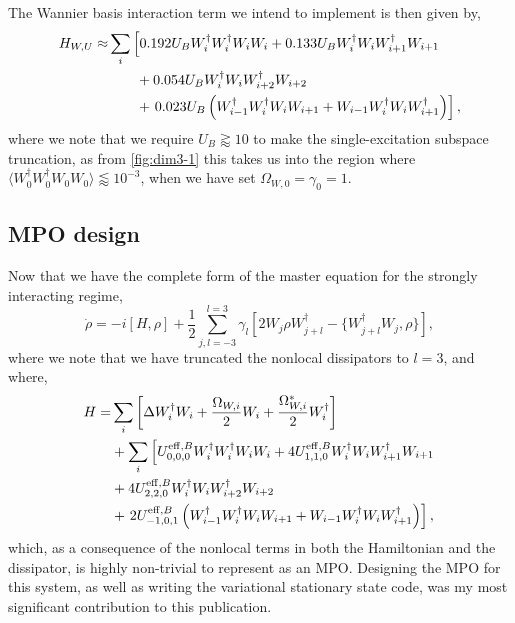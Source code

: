 The Wannier basis interaction term we intend to implement is then given by,
\begin{align}
	H_{W,U} \approx &\sum_{i} \left[ 0.192U_{B}W_{i}^{\dagger}W_{i}^{\dagger}W_{i}W_{i} + 0.133U_{B}W_{i}^{\dagger}W_{i}W_{i+1}^{\dagger}W_{i+1} \right. \notag \\
	&\qquad+ 0.054U_{B}W_{i}^{\dagger}W_{i}W_{i+2}^{\dagger}W_{i+2} \notag \\
	&\qquad+ \left. 0.023U_{B}\left(W_{i-1}^{\dagger}W_{i}^{\dagger}W_{i}W_{i+1} + W_{i-1}W_{i}^{\dagger}W_{i}W_{i+1}^{\dagger}\right)\right],
	\label{eq:dim3-1}
\end{align}
where we note that we require \(U_{B} \gtrapprox 10\) to make the single-excitation subspace truncation, as from \cref{fig:dim3-1} this takes us into the region where \(\langle W_{0}^{\dagger}W_{0}^{\dagger}W_{0}W_{0} \rangle \lessapprox 10^{-3}\), when we have set \(\Omega_{W,0} = \gamma_{0} = 1\).

\subsection{MPO design}
Now that we have the complete form of the master equation for the strongly interacting regime,
\begin{equation}
	\dot{\rho} = -i\left[H, \rho\right] + \frac{1}{2}\sum_{j,l=-3}^{l=3}\gamma_{l}\left[2W_{j}\rho W_{j+l}^{\dagger} - \{W_{j+l}^{\dagger}W_{j}, \rho\}\right],
	\label{eq:dim3-2}
\end{equation}
where we note that we have truncated the nonlocal dissipators to \(l=3\), and where,
\begin{align}
	H = &\sum_{i}\left[\Delta W_{i}^{\dagger}W_{i} + \frac{\Omega_{W,i}}{2}W_{i} + \frac{\Omega_{W,i}^{*}}{2}W_{i}^{\dagger}\right] \notag \\
	&+ \sum_{i}\left[ U^{\mathrm{eff},B}_{0,0,0}W_{i}^{\dagger}W_{i}^{\dagger}W_{i}W_{i} + 4U^{\mathrm{eff},B}_{1,1,0}W_{i}^{\dagger}W_{i}W_{i+1}^{\dagger}W_{i+1} \right. \notag \\
	&+ 4U^{\mathrm{eff},B}_{2,2,0}W_{i}^{\dagger}W_{i}W_{i+2}^{\dagger}W_{i+2} \notag \\
	&+ \left.2U^{\mathrm{eff},B}_{-1,0,1}\left(W_{i-1}^{\dagger}W_{i}^{\dagger}W_{i}W_{i+1} + W_{i-1}W_{i}^{\dagger}W_{i}W_{i+1}^{\dagger}\right) \right],
	\label{eq:dim3-3}
\end{align}
which, as a consequence of the nonlocal terms in both the Hamiltonian and the dissipator, is highly non-trivial to represent as an MPO. Designing the MPO for this system, as well as writing the variational stationary state code, was my most significant contribution to this publication.


